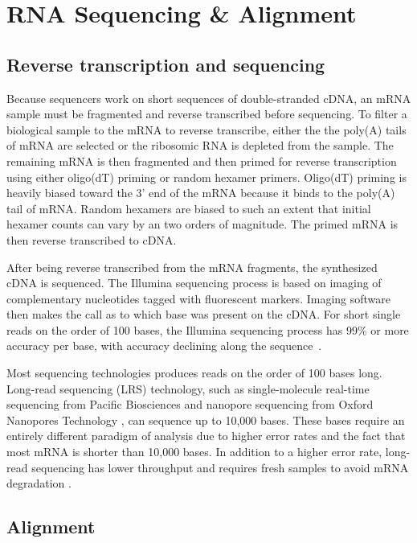 \documentclass[11pt]{report}
\begin{document}
\chapter{RNA Sequencing \& Alignment}

\section{Reverse transcription and sequencing}

Because sequencers work on short sequences of double-stranded cDNA, an
mRNA sample must be fragmented and reverse transcribed before
sequencing. To filter a biological sample to the mRNA to reverse
transcribe, either the the poly(A) tails of mRNA are selected or the
ribosomic RNA is depleted from the sample. The remaining mRNA is then
fragmented and then primed for reverse transcription using either
oligo(dT) priming or random hexamer primers. Oligo(dT) priming is
heavily biased toward the 3' end of the mRNA because it binds to the
poly(A) tail of mRNA. Random hexamers are biased to such an extent
that initial hexamer counts can vary by an two orders of magnitude.
The primed mRNA is then reverse transcribed to cDNA.

After being reverse transcribed from the mRNA fragments, the
synthesized cDNA is sequenced. The Illumina sequencing process is
based on imaging of complementary nucleotides tagged with fluorescent
markers. Imaging software then makes the call as to which base was
present on the cDNA. For short single reads on the order of 100 bases,
the Illumina sequencing process has 99\% or more accuracy per base,
with accuracy declining along the sequence~\citep{tan2019long}.

Most sequencing technologies produces reads on the order of 100 bases
long. Long-read sequencing (LRS) technology, such as single-molecule
real-time sequencing \citep{ardui2018single} from Pacific Biosciences
and nanopore sequencing from Oxford Nanopores Technology
\citep{deamer2016three}, can sequence up to 10,000 bases. These bases
require an entirely different paradigm of analysis due to higher error
rates and the fact that most mRNA is shorter than 10,000 bases. In
addition to a higher error rate, long-read sequencing has lower
throughput and requires fresh samples to avoid mRNA degradation
\citep{mantere2019long}.

\section{Alignment}
\end{document}
